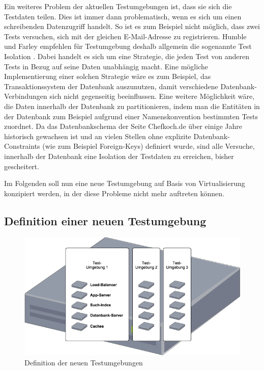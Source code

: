 Ein weiteres Problem der aktuellen Testumgebungen ist, dass sie sich die Testdaten teilen. Dies ist immer dann problematisch, wenn es sich um einen schreibenden Datenzugriff handelt. So ist es zum Beispiel nicht möglich, dass zwei Tests versuchen, sich mit der gleichen E-Mail-Adresse zu registrieren. Humble und Farley empfehlen für Testumgebung deshalb allgemein die sogenannte Test Isolation \citep[Vgl.][S. 337]{HumFar10}. Dabei handelt es sich um eine Strategie, die jeden Test von anderen Tests in Bezug auf seine Daten unabhängig macht. Eine mögliche Implementierung einer solchen Strategie wäre es zum Beispiel, das Transaktionssystem der Datenbank auszunutzen, damit verschiedene Datenbank-Verbindungen sich nicht gegenseitig beeinflussen. Eine weitere Möglichkeit wäre, die Daten innerhalb der Datenbank zu partitionieren, indem man die Entitäten in der Datenbank zum Beispiel aufgrund einer Namenskonvention bestimmten Tests zuordnet. Da das Datenbankschema der Seite Chefkoch.de über einige Jahre historisch gewachsen ist und an vielen Stellen ohne explizite Datenbank-Constraints (wie zum Beispiel Foreign-Keys) definiert wurde, sind alle Versuche, innerhalb der Datenbank eine Isolation der Testdaten zu erreichen, bisher gescheitert.

Im Folgenden soll nun eine neue Testumgebung auf Basis von Virtualisierung konzipiert werden, in der diese Probleme nicht mehr auftreten können.

\subsection{Definition einer neuen Testumgebung}

\begin{figure}[!ht]
  \begin{center}
    \includegraphics[width=14cm]{bilder/Untersuchungs-Umgebung.png}
    \caption{Definition der neuen Testumgebungen}
    \label{neue-test}
  \end{center}
\end{figure}


